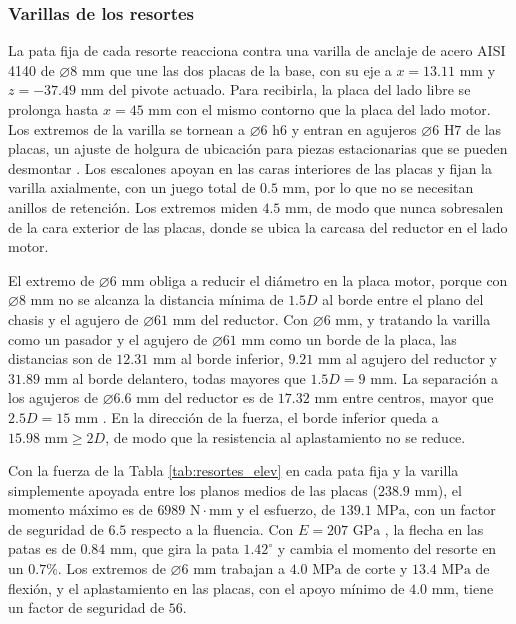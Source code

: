 \documentclass[../../General.tex]{subfiles}
\begin{document}
\subsubsection{Varillas de los resortes}

La pata fija de cada resorte reacciona contra una varilla de anclaje de acero AISI 4140 de $\varnothing 8\text{ mm}$ que une las dos placas de la base, con su eje a $x = 13.11\text{ mm}$ y $z = -37.49\text{ mm}$ del pivote actuado. Para recibirla, la placa del lado libre se prolonga hasta $x = 45\text{ mm}$ con el mismo contorno que la placa del lado motor. Los extremos de la varilla se tornean a $\varnothing 6\text{ h6}$ y entran en agujeros $\varnothing 6\text{ H7}$ de las placas, un ajuste de holgura de ubicación para piezas estacionarias que se pueden desmontar \citep{Shigley11th}. Los escalones apoyan en las caras interiores de las placas y fijan la varilla axialmente, con un juego total de $0.5\text{ mm}$, por lo que no se necesitan anillos de retención. Los extremos miden $4.5\text{ mm}$, de modo que nunca sobresalen de la cara exterior de las placas, donde se ubica la carcasa del reductor en el lado motor.

El extremo de $\varnothing 6\text{ mm}$ obliga a reducir el diámetro en la placa motor, porque con $\varnothing 8\text{ mm}$ no se alcanza la distancia mínima de $1.5D$ al borde \citep{aluminum2005manual} entre el plano del chasis y el agujero de $\varnothing 61\text{ mm}$ del reductor. Con $\varnothing 6\text{ mm}$, y tratando la varilla como un pasador y el agujero de $\varnothing 61\text{ mm}$ como un borde de la placa, las distancias son de $12.31\text{ mm}$ al borde inferior, $9.21\text{ mm}$ al agujero del reductor y $31.89\text{ mm}$ al borde delantero, todas mayores que $1.5D = 9\text{ mm}$. La separación a los agujeros de $\varnothing 6.6\text{ mm}$ del reductor es de $17.32\text{ mm}$ entre centros, mayor que $2.5D = 15\text{ mm}$ \citep{aluminum2005manual}. En la dirección de la fuerza, el borde inferior queda a $15.98\text{ mm} \geq 2D$, de modo que la resistencia al aplastamiento no se reduce.

Con la fuerza de la Tabla \ref{tab:resortes_elev} en cada pata fija y la varilla simplemente apoyada entre los planos medios de las placas ($238.9\text{ mm}$), el momento máximo es de $6989\text{ N}\cdot\text{mm}$ y el esfuerzo, de $139.1\text{ MPa}$, con un factor de seguridad de $6.5$ respecto a la fluencia. Con $E = 207\text{ GPa}$ \citep{Shigley11th}, la flecha en las patas es de $0.84\text{ mm}$, que gira la pata $1.42^\circ$ y cambia el momento del resorte en un $0.7\%$. Los extremos de $\varnothing 6\text{ mm}$ trabajan a $4.0\text{ MPa}$ de corte y $13.4\text{ MPa}$ de flexión, y el aplastamiento en las placas, con el apoyo mínimo de $4.0\text{ mm}$, tiene un factor de seguridad de $56$.
\end{document}
